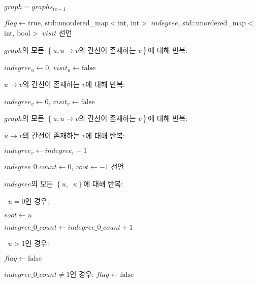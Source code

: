 \begin{algorithm}
	\item $graph = graphs_{tc - 1}$
	\item $flag \leftarrow \mathrm{true}$, std::unordered\_map$<$int, int$>$ $indegree$, std::unordered\_map$<$int, bool$>$ $visit$ 선언
	\item $graph$의 모든 $\left\{u, u \rightarrow v\textrm{의 간선이 존재하는 }v\right\}$에 대해 반복:
	\begin{algorithm}
		\item $indegree_u \leftarrow 0$, $visit_u \leftarrow \mathrm{false}$
		\item $u \rightarrow v\textrm{의 간선이 존재하는 }v$에 대해 반복:
		\begin{algorithm}
			\item $indegree_v \leftarrow 0$, $visit_v \leftarrow \mathrm{false}$
		\end{algorithm}
	\end{algorithm}
	\item $graph$의 모든 $\left\{u, u \rightarrow v\textrm{의 간선이 존재하는 }v\right\}$에 대해 반복:
	\begin{algorithm}
		\item $u \rightarrow v\textrm{의 간선이 존재하는 }v$에 대해 반복:
		\begin{algorithm}
			\item $indegree_v \leftarrow indegree_v + 1$
		\end{algorithm}
	\end{algorithm}
	\item $indegree\_0\_count \leftarrow 0$, $root \leftarrow -1$ 선언
	\item $indegree$의 모든 $\left\{u, \mathop{\mathrm{deg^-}}u\right\}$에 대해 반복:
	\begin{algorithm}
		\item $\mathop{\mathrm{deg^-}}u = 0$인 경우:
		\begin{algorithm}
			\item $root \leftarrow u$
			\item $indegree\_0\_count \leftarrow indegree\_0\_count + 1$
		\end{algorithm}
		\item $\mathop{\mathrm{deg^-}}u > 1$인 경우:
		\begin{algorithm}
			\item $flag \leftarrow \mathrm{false}$
		\end{algorithm}
	\end{algorithm}
	\item $indegree\_0\_count \neq 1$인 경우: $flag \leftarrow \mathrm{false}$

\end{algorithm}
